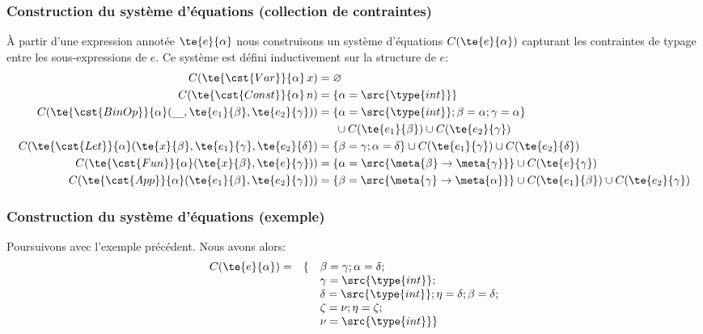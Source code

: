 %
\begin{frame}
\frametitle{Construction du système d'équations (collection de contraintes)}

À partir d'une expression annotée $\te{e}{\alpha}$ nous construisons
un système d'équations $C(\te{e}{\alpha})$ capturant les contraintes
de typage entre les sous-expressions de $e$. Ce système est défini
inductivement sur la structure de $e$:
\begin{align*}
   C(\te{\cst{Var}}{\alpha} \, x)
&= \varnothing\\
   C(\te{\cst{Const}}{\alpha} \, n)
&= \{\alpha = \src{\type{int}}\}\\
   C(\te{\cst{BinOp}}{\alpha}(\textrm{\Large \_}, \te{e_1}{\beta},
   \te{e_2}{\gamma}))
&= \{\alpha = \src{\type{int}}; \beta = \alpha; \gamma = \alpha\}\\
&\phantom{==} \cup C(\te{e_1}{\beta}) \cup C(\te{e_2}{\gamma})\\
C(\te{\cst{Let}}{\alpha}(\te{x}{\beta}, \te{e_1}{\gamma},
  \te{e_2}{\delta}) &=
  \{\beta = \gamma; \alpha = \delta\} \cup C(\te{e_1}{\gamma}) \cup
  C(\te{e_2}{\delta})\\
C(\te{\cst{Fun}}{\alpha} (\te{x}{\beta},\te{e}{\gamma})) &=
  \{\alpha = \src{\meta{\beta} \rightarrow \meta{\gamma}}\} \cup
  C(\te{e}{\gamma})\\
C(\te{\cst{App}}{\alpha} (\te{e_1}{\beta},\te{e_2}{\gamma})) &=
  \{\beta = \src{\meta{\gamma} \rightarrow \meta{\alpha}}\} \cup
  C(\te{e_1}{\beta}) \cup C(\te{e_2}{\gamma})
\end{align*}

\end{frame}

%
\begin{frame}
\frametitle{Construction du système d'équations (exemple)}

Poursuivons avec l'exemple précédent. Nous avons alors:
\[
\begin{array}{rrl}
  C(\te{e}{\alpha}) = & \{ & \beta = \gamma; \alpha = \delta; \\
                      & & \gamma = \src{\type{int}}; \\
                      & & \delta = \src{\type{int}}; \eta = \delta;
                          \beta = \delta; \\
                      & & \zeta = \nu; \eta = \zeta;\\
                      & & \nu = \src{\type{int}}\}
\end{array}
\]

\end{frame}

